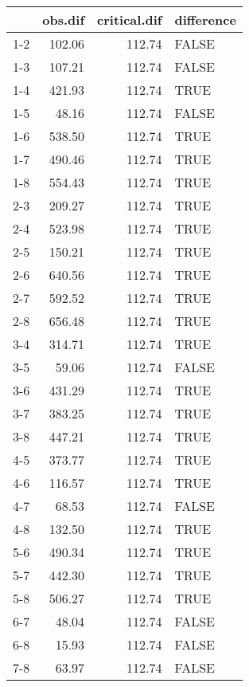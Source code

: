 \begin{table}[ht]
\centering
\begin{tabular}{rrrl}
  \hline
 & obs.dif & critical.dif & difference \\ 
  \hline
1-2 & 102.06 & 112.74 & FALSE \\ 
  1-3 & 107.21 & 112.74 & FALSE \\ 
  1-4 & 421.93 & 112.74 & TRUE \\ 
  1-5 & 48.16 & 112.74 & FALSE \\ 
  1-6 & 538.50 & 112.74 & TRUE \\ 
  1-7 & 490.46 & 112.74 & TRUE \\ 
  1-8 & 554.43 & 112.74 & TRUE \\ 
  2-3 & 209.27 & 112.74 & TRUE \\ 
  2-4 & 523.98 & 112.74 & TRUE \\ 
  2-5 & 150.21 & 112.74 & TRUE \\ 
  2-6 & 640.56 & 112.74 & TRUE \\ 
  2-7 & 592.52 & 112.74 & TRUE \\ 
  2-8 & 656.48 & 112.74 & TRUE \\ 
  3-4 & 314.71 & 112.74 & TRUE \\ 
  3-5 & 59.06 & 112.74 & FALSE \\ 
  3-6 & 431.29 & 112.74 & TRUE \\ 
  3-7 & 383.25 & 112.74 & TRUE \\ 
  3-8 & 447.21 & 112.74 & TRUE \\ 
  4-5 & 373.77 & 112.74 & TRUE \\ 
  4-6 & 116.57 & 112.74 & TRUE \\ 
  4-7 & 68.53 & 112.74 & FALSE \\ 
  4-8 & 132.50 & 112.74 & TRUE \\ 
  5-6 & 490.34 & 112.74 & TRUE \\ 
  5-7 & 442.30 & 112.74 & TRUE \\ 
  5-8 & 506.27 & 112.74 & TRUE \\ 
  6-7 & 48.04 & 112.74 & FALSE \\ 
  6-8 & 15.93 & 112.74 & FALSE \\ 
  7-8 & 63.97 & 112.74 & FALSE \\ 
   \hline
\end{tabular}
\end{table}
